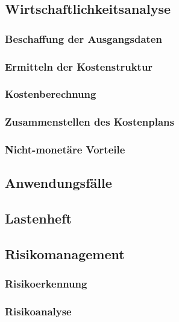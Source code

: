 \documentclass[11pt,toc=sectionentrywithoutdots, headheight=44pt, headings=optiontoheadandtoc]{scrartcl}
\begin{document}
\subsection{Wirtschaftlichkeitsanalyse}
\blindtext

\subsubsection{Beschaffung der Ausgangsdaten}
\blindtext

\subsubsection{Ermitteln der Kostenstruktur}
\blindtext

\subsubsection{Kostenberechnung}
\blindtext

\subsubsection{Zusammenstellen des Kostenplans}
\blindtext

\subsubsection{Nicht-monetäre Vorteile}
\blindtext

\subsection{Anwendungsfälle}
\blindtext

\subsection{Lastenheft}
\blindtext

\subsection{Risikomanagement}
\blindtext

\subsubsection{Risikoerkennung}
\blindtext

\subsubsection{Risikoanalyse}
\blindtext
\end{document}
